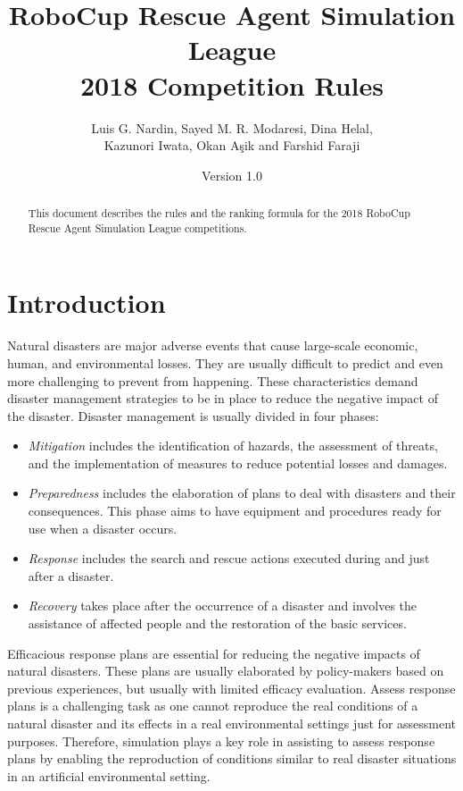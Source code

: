 \documentclass{article}
\begin{document}
\title{RoboCup Rescue Agent Simulation League\\
       2018 Competition Rules}
\author{Luis G. Nardin, Sayed M. R. Modaresi, Dina Helal,\\
Kazunori Iwata, Okan A{\c s}ik and Farshid Faraji}
\date{Version 1.0}
\maketitle
\begin{abstract}
This document describes the rules and the ranking formula for the 2018 RoboCup 
Rescue Agent Simulation League competitions.
\end{abstract}
\section{Introduction}
\label{sec:introduction}
Natural disasters are major adverse events that cause large-scale economic, 
human, and environmental losses. They are usually difficult to predict and even 
more challenging to prevent from happening. These characteristics demand 
disaster management strategies to be in place to reduce the negative impact of 
the disaster. Disaster management is usually divided in four phases:
\begin{itemize}
\item \emph{Mitigation} includes the identification of hazards, the assessment 
of threats, and the implementation of measures to reduce potential losses and 
damages.
\item \emph{Preparedness} includes the elaboration of plans to deal with  
disasters and their consequences. This phase aims to have equipment and 
procedures ready for use when a disaster occurs.
\item \emph{Response} includes the search and rescue actions executed during 
and just after a disaster.
\item \emph{Recovery} takes place after the occurrence of a disaster and 
involves the assistance of affected people and the restoration of the basic 
services.
\end{itemize}
  
Efficacious response plans are essential for reducing the negative impacts of 
natural disasters. These plans are usually elaborated by policy-makers based on 
previous experiences, but usually with limited efficacy evaluation. Assess
response plans is a challenging task as one cannot reproduce the real conditions
of a natural disaster and its effects in a real environmental settings just for
assessment purposes. Therefore, simulation plays a key role in assisting to
assess response plans by enabling the reproduction of conditions similar to
real disaster situations in an artificial environmental setting.
\end{document}
